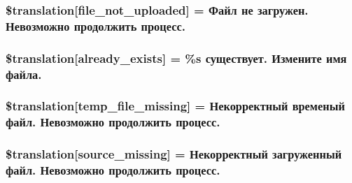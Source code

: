 \subsubsection[{\$translation}]{\setlength{\rightskip}{0pt plus 5cm}\$translation\mbox{[}\textquotesingle{}file\+\_\+not\+\_\+uploaded\textquotesingle{}\mbox{]} = \textquotesingle{}Файл не загружен. Невозможно продолжить процесс.\textquotesingle{}}\label{class_8upload_8ru___r_u_8php_a4ce76e7be0b3a03c2b47f6d70c21832e}
\hypertarget{class_8upload_8ru___r_u_8php_afd84e910217f04139f567c41e292afa5}{}
\subsubsection[{\$translation}]{\setlength{\rightskip}{0pt plus 5cm}\$translation\mbox{[}\textquotesingle{}already\+\_\+exists\textquotesingle{}\mbox{]} = \textquotesingle{}\%s существует. Измените имя файла.\textquotesingle{}}\label{class_8upload_8ru___r_u_8php_afd84e910217f04139f567c41e292afa5}
\hypertarget{class_8upload_8ru___r_u_8php_ab0fa87a88aba2624004581eed0633325}{}
\subsubsection[{\$translation}]{\setlength{\rightskip}{0pt plus 5cm}\$translation\mbox{[}\textquotesingle{}temp\+\_\+file\+\_\+missing\textquotesingle{}\mbox{]} = \textquotesingle{}Некорректный временый файл. Невозможно продолжить процесс.\textquotesingle{}}\label{class_8upload_8ru___r_u_8php_ab0fa87a88aba2624004581eed0633325}
\hypertarget{class_8upload_8ru___r_u_8php_aceaaf7355acaaf10f0ae60378d03c468}{}
\subsubsection[{\$translation}]{\setlength{\rightskip}{0pt plus 5cm}\$translation\mbox{[}\textquotesingle{}source\+\_\+missing\textquotesingle{}\mbox{]} = \textquotesingle{}Некорректный загруженный файл. Невозможно продолжить процесс.\textquotesingle{}}\label{class_8upload_8ru___r_u_8php_aceaaf7355acaaf10f0ae60378d03c468}
\hypertarget{class_8upload_8ru___r_u_8php_aff2427c72a2598aefa6d58df1dd18b08}{}
